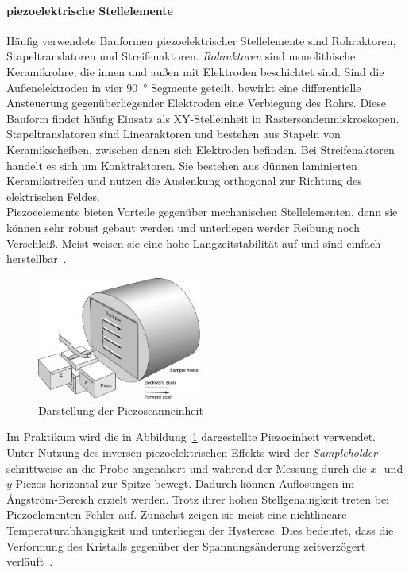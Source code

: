 \documentclass[a4paper,twoside,final]{article}
\begin{document}
\paragraph{piezoelektrische Stellelemente}
Häufig verwendete Bauformen piezoelektrischer Stellelemente sind Rohraktoren, Stapeltranslatoren und Streifenaktoren.
\textit{Rohraktoren} sind monolithische Keramikrohre, die innen und außen mit Elektroden beschichtet sind. Sind die Außenelektroden in vier \SI{90}{\degree} Segmente geteilt,  bewirkt eine differentielle Ansteuerung gegenüberliegender Elektroden eine Verbiegung des Rohrs. Diese Bauform findet häufig Einsatz als XY-Stelleinheit in Rastersondenmiskroskopen.
Stapeltranslatoren sind Linearaktoren und bestehen aus Stapeln von Keramikscheiben, zwischen denen sich Elektroden befinden. Bei Streifenaktoren handelt es sich um Konktraktoren. Sie bestehen aus dünnen laminierten Keramikstreifen und nutzen die Auslenkung orthogonal zur Richtung des elektrischen Feldes.\\
Piezoeelemente bieten Vorteile gegenüber mechanischen Stellelementen, denn sie können sehr robust gebaut werden und unterliegen werder Reibung noch Verschleiß. Meist weisen sie eine hohe Langzeitstabilität auf und sind einfach herstellbar~\cite{Versuchsanleitung}.
\newpage
\begin{figure}
  \centering
  \vspace{-3mm}
  \includegraphics[width=5.4cm]{Bilder/Piezoscanner.pdf}
  \caption{Darstellung der Piezoscanneinheit~\cite{Nanosurf}}
  \label{fig:Piezo}
\end{figure}
Im Praktikum wird die in Abbildung~\ref{fig:Piezo} dargestellte Piezoeinheit verwendet. Unter Nutzung des inversen piezoelektrischen Effekts wird der \textit{Sampleholder} schrittweise an die Probe angenähert und während der Messung durch die $x$- und $y$-Piezos horizontal zur Spitze bewegt. Dadurch können Auflösungen im Ångström-Bereich erzielt werden.
Trotz ihrer hohen Stellgenauigkeit treten bei Piezoelementen Fehler auf. Zunächst zeigen sie meist eine nichtlineare Temperaturabhängigkeit und unterliegen der Hysterese. Dies bedeutet, dass die Verformung des Kristalls gegenüber der Spannungsänderung zeitverzögert verläuft~\cite{Versuchsanleitung}.
\end{document}
